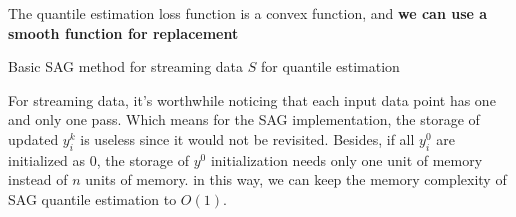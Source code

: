 The quantile estimation loss function is a convex function, and \textbf{we can use a smooth function for replacement}
\begin{algorithm}
    \caption{Basic SAG method for streaming data $S$ for quantile estimation}\label{alg:SAG}
        \begin{algorithmic}[1]
                       
                 
            \EndFor
        \end{algorithmic}
\end{algorithm}
For streaming data, it's worthwhile noticing that each input data point has one and only one pass. Which means for the SAG implementation, the storage of updated $y_i^k$ is useless since it would not be revisited. Besides, if all $y_i^0$ are initialized as 0, the storage of $y^0$ initialization needs only one unit of memory instead of $n$ units of memory. in this way, we can keep the memory complexity of SAG quantile estimation to $O(1)$.


